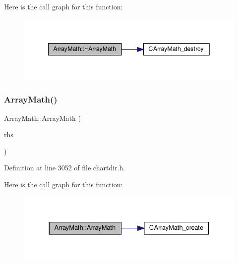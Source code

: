 Here is the call graph for this function\+:
\nopagebreak
\begin{figure}[H]
\begin{center}
\leavevmode
\includegraphics[width=342pt]{class_array_math_a65d4e3680182f61c866a61f375639245_cgraph}
\end{center}
\end{figure}
\mbox{\label{class_array_math_a04ce35d72b715dc2f5889ff040872c1e}} 
\subsubsection{\texorpdfstring{Array\+Math()}{ArrayMath()}\hspace{0.1cm}{\footnotesize\ttfamily [2/2]}}
{\footnotesize\ttfamily Array\+Math\+::\+Array\+Math (\begin{DoxyParamCaption}\item[{const \hyperlink{class_array_math}{Array\+Math} \&}]{rhs }\end{DoxyParamCaption})\hspace{0.3cm}{\ttfamily [inline]}}



Definition at line 3052 of file chartdir.\+h.

Here is the call graph for this function\+:
\nopagebreak
\begin{figure}[H]
\begin{center}
\leavevmode
\includegraphics[width=330pt]{class_array_math_a04ce35d72b715dc2f5889ff040872c1e_cgraph}
\end{center}
\end{figure}


